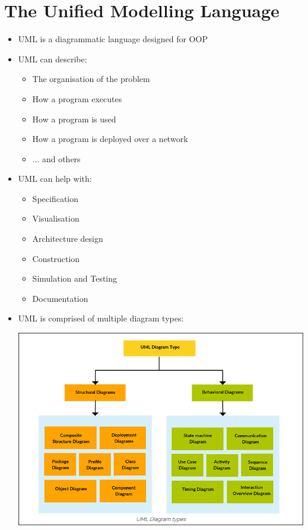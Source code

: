 \documentclass{article}[18pt]
\begin{document}
\section{The Unified Modelling Language}
\begin{itemize}
	\item UML is a diagrammatic language designed for OOP
	\item UML can describe:
	\begin{itemize}
		\item The organisation of the problem
		\item How a program executes
		\item How a program is used
		\item How a program is deployed over a network
		\item ... and others
	\end{itemize}
	\item UML can help with:
	\begin{itemize}
		\item Specification
		\item Visualisation
		\item Architecture design
		\item Construction
		\item Simulation and Testing
		\item Documentation
	\end{itemize}
	\item UML is comprised of multiple diagram types:
	\begin{center}
		\includegraphics[scale=1]{UML}
	\end{center}
\end{itemize}
\end{document}
